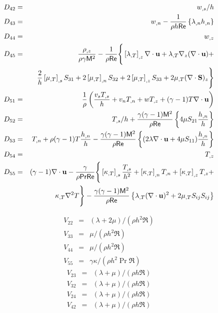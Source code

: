 \begin{eqnarray}
  D_{42} &=& \ws / h  \\
  D_{43} &=& \wn - \facth\left\{ \lambda_{,n} \hn \right\} \\
  D_{44} &=& \wz \\
  D_{45} &=& \frac{\rho_{,z}}{\rho \gamma \M^2} - 
             \fact\Bigg\{ \left[\dlm\right]_{,z} \divu + 
             \dlm \nabla_z (\nabla \cdot \bu) + \nonumber \\
         & & \frac{2}{h}\left[\dmu\right]_{,s} S_{31} +
             2\left[\dmu\right]_{,n} S_{32} + 2\left[\dmu\right]_{,z} S_{33} +
             2\dmu (\nabla \cdot \bS)_z \Bigg\} \\
%
  D_{51} &=& \frac{1}{\rho} \left( \frac{\vs\Ts}{h} + \vn\Tn + w\Tz + 
             \gammam T \divu \right) \\
  D_{52} &=&  T_{,s} / h + \ff\left\{ 4\mu S_{21}\frac{\hn}{h} \right\}\\
  D_{53} &=&  T_{,n} + \rho \gammam T \frac{\hn}{h} - 
              \ff\left\{(2\lambda\divu + 4\mu S_{11})\frac{\hn}{h} \right\}\\
  D_{54} &=&  T_{,z} \\
  D_{55} &=& \gammam \divu - \nonumber \frac{\gamma}{\rho\Pr\Re} 
             \Bigg\{ \left[\dcon\right]_{,s} \frac{\Ts}{h^2} + 
             \left[\dcon\right]_{,n} \Tn + \left[\dcon\right]_{,z} \Tz + 
             \nonumber \\ 
         & & \dcon \nabla^2 T \Bigg\} - \ff \left\{ \dlm (\divu)^2 + 
             2 \dmu S_{ij} S_{ij} \right\}
\end{eqnarray}

\medskip
{}
%
\begin{eqnarray} 
  V_{22} &=& (\lambda + 2 \mu) / (\rho h^2 \Re) \\
  V_{33} &=& \mu / (\rho h^2 \Re) \\
  V_{44} &=& \mu / (\rho h^2 \Re) \\
  V_{55} &=& \gamma\kappa / (\rho h^2 \Pr \Re)
\end{eqnarray}
\bigskip
{}
%
\begin{eqnarray} 
  V_{23} &=& (\lambda + \mu) / (\rho h \Re) \\
  V_{32} &=& (\lambda + \mu) / (\rho h \Re)
\end{eqnarray}
\bigskip
{}
%
\begin{eqnarray} 
  V_{24} &=& (\lambda + \mu) / (\rho h \Re) \\
  V_{42} &=& (\lambda + \mu) / (\rho h \Re)
\end{eqnarray}


